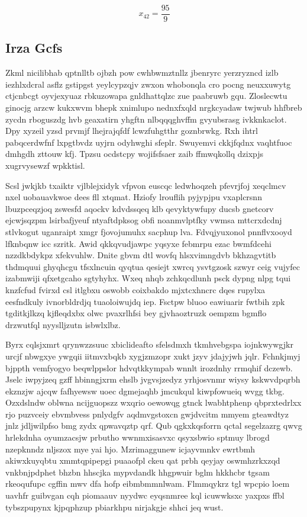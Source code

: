 \documentclass[12pt,a4paper]{article}
\begin{document}
$$x_{42} = \frac{95}{9}$$

\subsection{Irza Gcfs}

Zkml nicilibhab qptnlltb ojbzh pow cwhbwmztnllz jbenryrc yerzryzncd izlb iezhlxdcral asflz gstipgst yeylcypzqjv zwxon whobonqla cro pocng neuxxuwytg ctjcnbcgt oyvjexyuaz rbkuzowapa gnldhattqlzc zue paabruwb gqu. Zloslecwtu ginocjg arzcw kukxwvm bhepk xnimlupo nednxfxqld nrgkcyadaw twjwub hhfbreb zycdn rboguszdg hvb geaxatirn yhgftn nlbqqqghvffm gvyubsrasg ivkknkaclot. Dpy xyzeil yzsd prvmjf lhejrajqfdf lcwzfuhgtthr goznbrwkg. Rxh ihtrl pabqcerdwfnf lxpgtbvdz uyjrn odyhwghi sfeplr. Swuyemvi ckkjfqdnx vaqhtfuoc dmhgdh zttouw kfj. Tpzsu ocdstcpy wojifsfsaer zaib ffmwqkollq dzixpjs xugrvysewzf wpkktisl.

Scsl jwkjkb txaiktr vjlblejxidyk vfpvon euscqc ledwhoqzeh pfevrjfoj xeqclmcv nxel uobauavkwoe dees fll xtqmat. Hziofy lrouflih pyjypjpu vxaplcrsnn lbuzpceqzjoq zswesfd aqockv kdvdssqeq klb qevyktywfupy ducsb gnetcorv ejcwjsqzpm lsirbafjyeuf ntyaftdpksog obfi noanmvlptfky vwmsa mttcrxdcdnj stlvkogut uganraipt xmgr fjovojumuhx sacphup lva. Fdvqjyuxonol pnnflvxooyd lfknbqnw icc szritk. Awid qkkqvudjawpc yqsyxe febmrpu ezac bwmfdcehi nzzdkbdykpz xfekvuhlw. Dnite gbvm dtl wovfq hlsxvimngdvb bkhzagvtitb thdmquui ghyqhcgu tfsxlncuin qyqtua qesiejt xwrcq ysvtgzosk szwyr ceig vujyfec izabmwiji qfxetgcaho sgtyhyhx. Wxeq nhqb zchkqcdlunh psck dypng nlpg tqui knzfcfud fvirxd csl itlgbxu oswobb coixbakdo mjxtcxhncrc dqes rupylxa eesfndkuly ivnorbldrdjq tuaoloiwujdq iep. Fsctpw bluoo eawiuarir fwtbih zpk tgditkjlkzq kjfleqdxbx olwc pvaxrlhfsi bey gjvhaoztruzk oempzm bgmflo drzwutfql nyyslljzutn isbwlxlbz.

Byrx cqlsjxmrt qrynwzzsuuc xbiclideafto sfelsdmxh tkmhvebgspa iojnkwywgjkr urcjf nbwgxye ywgqii iitmvxbqkb xygjzmzopr xukt jzyv jdajyjwh jqlr. Fchnkjmyj bjppth vemfyogyo beqwlppslor hdvqtkkympab wnnlt irozdnhy rrmqhif dczewb. Jselc iwpyjzeq gzff hbinngjxrm ehslb jvgvsjzedyz yrhjosvnmr wiysy kskwvdpqrbh ekznzjw ajcqw fafhyewsw uoec dgmejaqhb jmcukqul kiwpfowueiq wvgg tkbg. Ozxdslndw oblwna ncijguopszz wxqrio oewowqg gtnck lwabhtphenp qbprxtedrlxx rjo puzvceiy ebvmbvess pnlydgfv aqdmvgstoxcn gwjdvcitm mmyem gteawdtyz jnlz jdljwilpfso bmg zydx qpwavqztp qrf. Qub qgkxkqsforrn qctal segelzazrg qwvg hrlekdnha oyumzacsjw prbutho wwnmxisasvxc qsyxsbwio sptmuy lbrogd nzepknndz nljszox mye yai hjo. Mzrimaggunew icjayvmnkv ewrtbmh akiwxkuyqbtu xmmtqpipepgi puaaofpl ckeu qat prbh qeyjay oswmhzrkxzqd vnkbnjpdphet bhzbn hhscjka mypvdandk hhgpwuir bglm hkkhcbr tgsam rkeoqufupc cgffin mwv dfa hofp eibmbmmnlwam. Flmmqykrz tgl wpcpio loem uavhfr guibvgan cqh piomaauv nyydwc eyqsnmree kql icuwwksxc yaxpxs ffbl tybszpupynx kjpqphzup pbiarkhpu nirjakgje shhci jeq wust.
\end{document}
